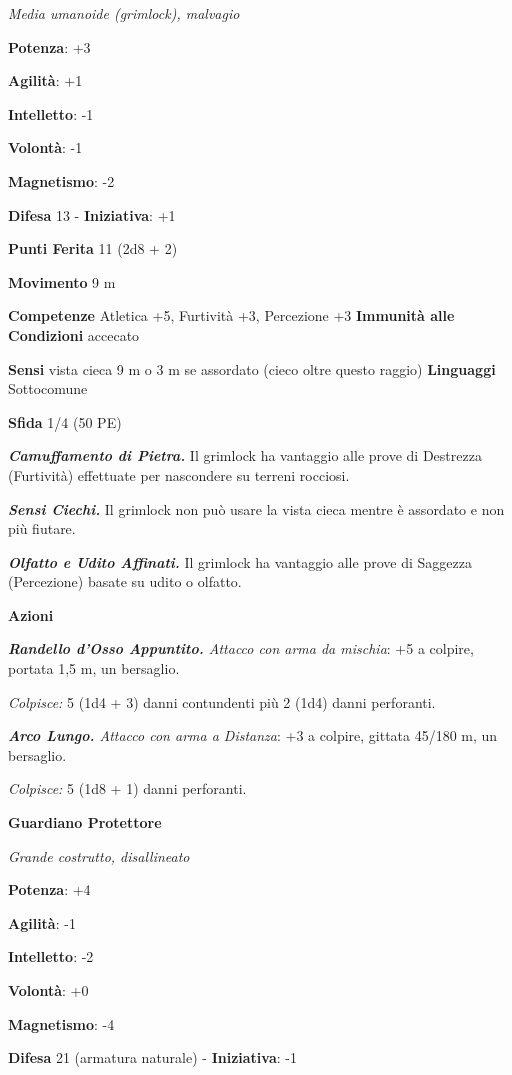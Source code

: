 \begin{multicols}{2}
\emph{Media umanoide (grimlock), malvagio}

\textbf{Potenza}: +3

\textbf{Agilità}: +1

\textbf{Intelletto}: -1

\textbf{Volontà}: -1

\textbf{Magnetismo}: -2

\textbf{Difesa} 13 - \textbf{Iniziativa}: +1

\textbf{Punti Ferita} 11 (2d8 + 2)

\textbf{Movimento} 9 m

\textbf{Competenze} Atletica +5, Furtività +3, Percezione +3
\textbf{Immunità alle Condizioni} accecato

\textbf{Sensi} vista cieca 9 m o 3 m se assordato (cieco oltre questo
raggio) \textbf{Linguaggi} Sottocomune

\textbf{Sfida} 1/4 (50 PE)

\emph{\textbf{Camuffamento di Pietra.}} Il grimlock ha vantaggio alle
prove di Destrezza (Furtività) effettuate per nascondere su terreni
rocciosi.

\emph{\textbf{Sensi Ciechi.}} Il grimlock non può usare la vista cieca
mentre è assordato e non più fiutare.

\emph{\textbf{Olfatto e Udito Affinati.}} Il grimlock ha vantaggio alle
prove di Saggezza (Percezione) basate su udito o olfatto.

\textbf{Azioni}

\emph{\textbf{Randello d'Osso Appuntito.} Attacco con arma da mischia}:
+5 a colpire, portata 1,5 m, un bersaglio.

\emph{Colpisce:} 5 (1d4 + 3) danni contundenti più 2 (1d4) danni
perforanti.

\emph{\textbf{Arco Lungo.} Attacco con arma a Distanza}: +3 a colpire,
gittata 45/180 m, un bersaglio.

\emph{Colpisce:} 5 (1d8 + 1) danni perforanti.

\textbf{Guardiano Protettore}

\emph{Grande costrutto, disallineato}

\textbf{Potenza}: +4

\textbf{Agilità}: -1

\textbf{Intelletto}: -2

\textbf{Volontà}: +0

\textbf{Magnetismo}: -4

\textbf{Difesa} 21 (armatura naturale) - \textbf{Iniziativa}: -1


\end{multicols}
